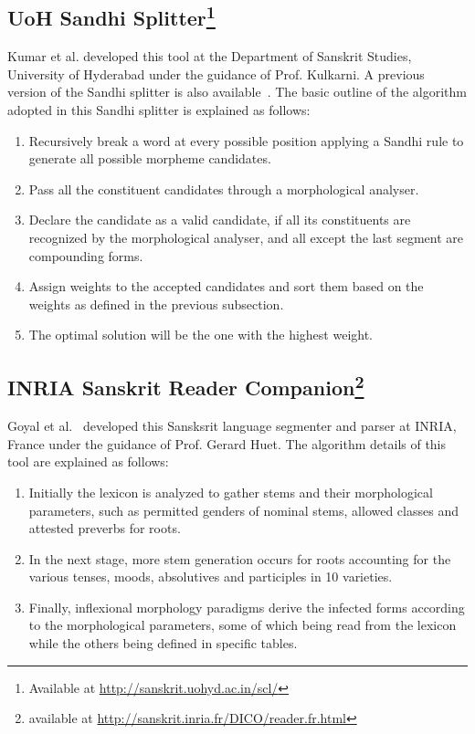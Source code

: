 \documentclass[11pt]{article}
\begin{document}
\subsection{UoH Sandhi Splitter\footnote{Available at \url{http://sanskrit.uohyd.ac.in/scl/} }}
Kumar et al.\cite{Kumar2010} developed this tool at the Department of Sanskrit Studies, University of Hyderabad under the guidance of Prof. Kulkarni. 
A previous version of the Sandhi splitter is also available~\cite{ss}. The basic outline of the algorithm adopted in this Sandhi splitter is explained as follows:
\begin{enumerate}
	\item Recursively break a word at every possible position applying a Sandhi rule to generate all possible morpheme candidates.
	\item Pass all the constituent candidates through a morphological analyser.
	\item Declare the candidate as a valid candidate, if all its constituents are recognized by the morphological analyser, and all except the last segment are compounding forms.
	\item Assign weights to the accepted candidates and sort them based on the weights as defined in the previous subsection.
	\item The optimal solution will be the one with the highest weight.
\end{enumerate}

\subsection{INRIA Sanskrit Reader Companion\footnote{available at \url{http://sanskrit.inria.fr/DICO/reader.fr.html}}} Goyal et al.~\cite{goyal2013completeness} developed this Sansksrit language segmenter and parser at INRIA, France under the guidance of Prof. Gerard Huet. The algorithm details of this tool are explained as follows:
\begin{enumerate}
	\item Initially the lexicon is analyzed to gather stems and their morphological parameters, such as permitted genders of nominal stems, allowed classes and attested preverbs for roots.
	\item In the next stage, more stem generation occurs for roots accounting for the various tenses, moods, absolutives and participles in 10 varieties. 
	\item Finally, inflexional  morphology  paradigms  derive  the  infected  forms  according  to  the morphological parameters, some of which being read from the lexicon while the others being defined in specific tables. 
\end{enumerate}
\end{document}
